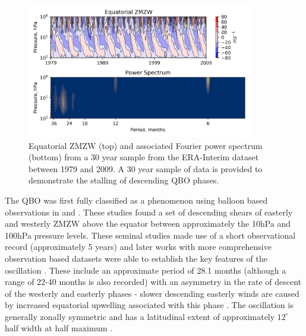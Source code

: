 \begin{figure}[h!]
\centering
    \includegraphics[width=0.88\textwidth]{Figures/Figures-background/QBO_SAO_ERA.png}
    \caption{Equatorial ZMZW (top) and associated Fourier power spectrum (bottom) from a 30 year sample from the ERA-Interim dataset between 1979 and 2009. A 30 year sample of data is provided to demonstrate the stalling of descending QBO phases.}
    \label{fig:QBO_SAO_ERA}
\centering
\end{figure}

The QBO was first fully classified as a phenomenon using balloon based observations in \cite{Ebdon1960} and \cite{Reed1964}. These studies found a set of descending shears of easterly and westerly ZMZW above the equator between approximately the 10hPa and 100hPa pressure levels. These seminal studies made use of a short observational record (approximately 5 years) and later works with more comprehensive observation based datasets were able to establish the key features of the oscillation \citep{Baldwin2001,Pascoe2005}. These include an approximate period of 28.1 months (although a range of 22-40 months is also recorded) with an asymmetry in the rate of descent of the westerly and easterly phases - slower descending easterly winds are caused by increased equatorial upwelling associated with this phase \citep{Pascoe2005}. The oscillation is generally zonally symmetric \citep{BELMONT1968} and has a latitudinal extent of approximately $12^{\circ}$ half width at half maximum \citep{Baldwin2001}.

